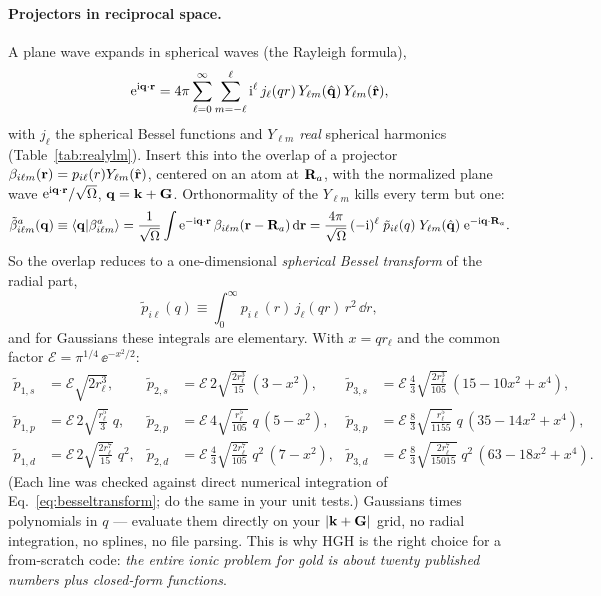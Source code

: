 \paragraph{Projectors in reciprocal space.} A plane wave expands in
spherical waves (the Rayleigh formula),
\begin{equation}
\mathrm{e}^{\mathrm{i}\mathbf{q}\cdot\mathbf{r}} = 4\pi \sum_{\ell=0}^{\infty}\sum_{m=-\ell}^{\ell}
\mathrm{i}^{\ell}\, j_\ell(qr)\, Y_{\ell m}(\hat{\mathbf{q}})\, Y_{\ell m}(\hat{\mathbf{r}}),
\label{eq:rayleigh}
\end{equation}
with $j_\ell$ the spherical Bessel functions and $Y_{\ell m}$ \emph{real}
spherical harmonics (Table~\ref{tab:realylm}). Insert this into the overlap
of a projector $\beta_{i\ell m}(\mathbf{r}) = p_{i\ell}(r) Y_{\ell m}(\hat{\mathbf{r}})$,
centered on an atom at $\mathbf{R}_a$, with the normalized plane wave
$\mathrm{e}^{\mathrm{i}\mathbf{q}\cdot\mathbf{r}}/\sqrt\Omega$, $\mathbf{q} = \mathbf{k}+\mathbf{G}$. Orthonormality of the
$Y_{\ell m}$ kills every term but one:
\begin{equation}
\tilde\beta^{a}_{i\ell m}(\mathbf{q}) \equiv \braket{\mathbf{q}|\beta^{a}_{i\ell m}}
= \frac{1}{\sqrt\Omega}\int \mathrm{e}^{-\mathrm{i}\mathbf{q}\cdot\mathbf{r}}\,
\beta_{i\ell m}(\mathbf{r} - \mathbf{R}_a)\,\mathrm{d}\mathbf{r}
= \frac{4\pi}{\sqrt\Omega}\,(-\mathrm{i})^{\ell}\;
\tilde p_{i\ell}(q)\; Y_{\ell m}(\hat{\mathbf{q}})\;\mathrm{e}^{-\mathrm{i}\mathbf{q}\cdot\mathbf{R}_a} .
\label{eq:betaG}
\end{equation}
So the overlap reduces to a one-dimensional \emph{spherical Bessel
transform} of the radial part,
\begin{equation}
\tilde p_{i\ell}(q) \equiv \int_0^\infty p_{i\ell}(r)\, j_\ell(qr)\, r^2\,
\dd r ,
\label{eq:besseltransform}
\end{equation}
and for Gaussians these integrals are elementary. With $x = q r_\ell$ and
the common factor $\mathcal E = \pi^{1/4}\, \ee^{-x^2/2}$:
\begin{equation}
\begin{aligned}
\tilde p_{1,s} &= \mathcal E \sqrt{2 r_\ell^3},
&
\tilde p_{2,s} &= \mathcal E\, 2\sqrt{\tfrac{2 r_\ell^3}{15}}\,(3 - x^2),
&
\tilde p_{3,s} &= \mathcal E\, \tfrac43\sqrt{\tfrac{2 r_\ell^3}{105}}\,
(15 - 10x^2 + x^4),
\\
\tilde p_{1,p} &= \mathcal E\, 2\sqrt{\tfrac{r_\ell^5}{3}}\; q,
&
\tilde p_{2,p} &= \mathcal E\, 4\sqrt{\tfrac{r_\ell^5}{105}}\; q\,(5 - x^2),
&
\tilde p_{3,p} &= \mathcal E\, \tfrac83\sqrt{\tfrac{r_\ell^5}{1155}}\; q\,
(35 - 14x^2 + x^4),
\\
\tilde p_{1,d} &= \mathcal E\, 2\sqrt{\tfrac{2 r_\ell^7}{15}}\; q^2,
&
\tilde p_{2,d} &= \mathcal E\, \tfrac43\sqrt{\tfrac{2 r_\ell^7}{105}}\;
q^2\,(7 - x^2),
&
\tilde p_{3,d} &= \mathcal E\, \tfrac83\sqrt{\tfrac{2 r_\ell^7}{15015}}\;
q^2\,(63 - 18x^2 + x^4).
\end{aligned}
\label{eq:hghprojG}
\end{equation}
(Each line was checked against direct numerical integration of
Eq.~\eqref{eq:besseltransform}; do the same in your unit tests.) Gaussians
times polynomials in $q$ --- evaluate them directly on your $|\mathbf{k}+\mathbf{G}|$
grid, no radial integration, no splines, no file parsing. This is
why HGH is the right choice for a from-scratch code: \emph{the entire ionic
problem for gold is about twenty published numbers plus closed-form
functions}.

